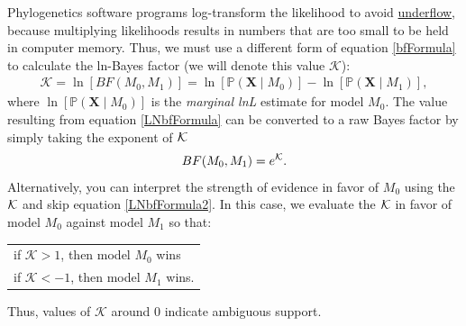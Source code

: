 Phylogenetics software programs log-transform the likelihood to avoid \href{http://en.wikipedia.org/wiki/Arithmetic_underflow}{underflow}, because multiplying likelihoods results in numbers that are too small to be held in computer memory.
Thus, we must use a different form of equation \ref{bfFormula} to calculate the ln-Bayes factor (we will denote this value $\mathcal{K}$):
\begin{align}\label{LNbfFormula}
\mathcal{K}=\ln[BF(M_0,M_1)] = \ln[\mathbb{P}(\mathbf X \mid M_0)]-\ln[\mathbb{P}(\mathbf X \mid M_1)],
\end{align}
where $\ln[\mathbb{P}(\mathbf X \mid M_0)]$ is the \textit{marginal lnL} estimate for model $M_0$. 
The value resulting from equation \ref{LNbfFormula} can be converted to a raw Bayes factor by simply taking the exponent of $\cal{K}$
\begin{align}\label{LNbfFormula2}
BF(M_0,M_1) = e^{\cal{K}}.
\end{align}
Alternatively, you can interpret the strength of evidence in favor of $M_0$ using the $\cal{K}$ and skip equation \ref{LNbfFormula2}. 
In this case, we evaluate the $\cal{K}$ in favor of model $M_0$ against model $M_1$ so that:
\begin{center}
\begin{tabular}{l}
if $\mathcal{K} > 1$, then model $M_0$ wins\\
if $\mathcal{K} < -1$, then model $M_1$ wins.
\end{tabular}
\end{center}
Thus, values of $\mathcal{K}$ around 0 indicate ambiguous support. 




